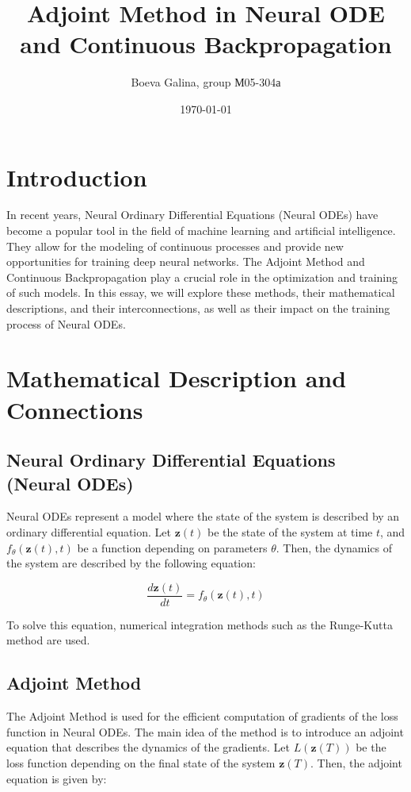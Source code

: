 \documentclass[a4paper,12pt]{article}
\theoremstyle{plain} %
\theoremstyle{definition} %
\theoremstyle{remark} %
\begin{document}
\title{Adjoint Method in Neural ODE and Continuous Backpropagation}
\author{Boeva Galina, group М05-304а}
\date{\today}

\maketitle

\section{Introduction}

In recent years, Neural Ordinary Differential Equations (Neural ODEs) have become a popular tool in the field of machine learning and artificial intelligence. They allow for the modeling of continuous processes and provide new opportunities for training deep neural networks. The Adjoint Method and Continuous Backpropagation play a crucial role in the optimization and training of such models. In this essay, we will explore these methods, their mathematical descriptions, and their interconnections, as well as their impact on the training process of Neural ODEs.

\section{Mathematical Description and Connections}

\subsection{Neural Ordinary Differential Equations (Neural ODEs)}

Neural ODEs represent a model where the state of the system is described by an ordinary differential equation. Let \( \mathbf{z}(t) \) be the state of the system at time \( t \), and \( f_\theta(\mathbf{z}(t), t) \) be a function depending on parameters \( \theta \). Then, the dynamics of the system are described by the following equation:

\[ \frac{d\mathbf{z}(t)}{dt} = f_\theta(\mathbf{z}(t), t) \]

To solve this equation, numerical integration methods such as the Runge-Kutta method are used.

\subsection{Adjoint Method}

The Adjoint Method is used for the efficient computation of gradients of the loss function in Neural ODEs. The main idea of the method is to introduce an adjoint equation that describes the dynamics of the gradients. Let \( L(\mathbf{z}(T)) \) be the loss function depending on the final state of the system \( \mathbf{z}(T) \). Then, the adjoint equation is given by:
\end{document}
